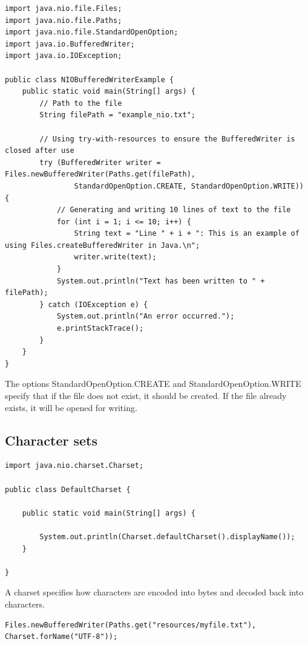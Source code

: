 \begin{lstlisting}
import java.nio.file.Files;
import java.nio.file.Paths;
import java.nio.file.StandardOpenOption;
import java.io.BufferedWriter;
import java.io.IOException;

public class NIOBufferedWriterExample {
    public static void main(String[] args) {
        // Path to the file
        String filePath = "example_nio.txt";

        // Using try-with-resources to ensure the BufferedWriter is closed after use
        try (BufferedWriter writer = Files.newBufferedWriter(Paths.get(filePath), 
                StandardOpenOption.CREATE, StandardOpenOption.WRITE)) {
            // Generating and writing 10 lines of text to the file
            for (int i = 1; i <= 10; i++) {
                String text = "Line " + i + ": This is an example of using Files.createBufferedWriter in Java.\n";
                writer.write(text);
            }
            System.out.println("Text has been written to " + filePath);
        } catch (IOException e) {
            System.out.println("An error occurred.");
            e.printStackTrace();
        }
    }
}
\end{lstlisting}

The options StandardOpenOption.CREATE and StandardOpenOption.WRITE specify that if the file does not exist, it should be created. If the file already exists, it will be opened for writing.

\subsection{Character sets}

\begin{lstlisting}
import java.nio.charset.Charset;

public class DefaultCharset {

	public static void main(String[] args) {

		System.out.println(Charset.defaultCharset().displayName());
	}

}
\end{lstlisting}

A charset specifies how characters are encoded into bytes and decoded back into characters.


\begin{lstlisting}
Files.newBufferedWriter(Paths.get("resources/myfile.txt"), Charset.forName("UTF-8"));
\end{lstlisting}

